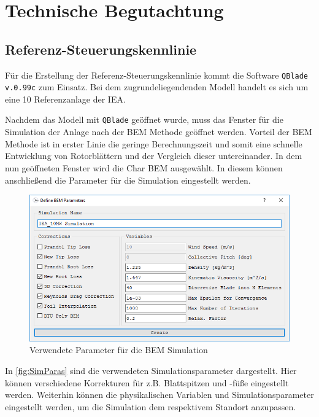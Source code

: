 \section{Technische Begutachtung}

\subsection{Referenz-Steuerungskennlinie}

Für die Erstellung der Referenz-Steuerungskennlinie kommt die Software \texttt{QBlade v.0.99c} zum Einsatz. Bei dem zugrundeliegendenden Modell handelt es sich um eine \SI{10}{\mw} Referenzanlage der \gls{IEA}.\medskip

Nachdem das Modell mit \texttt{QBlade} geöffnet wurde, muss das Fenster für die Simulation der Anlage nach der \gls{BEM} Methode geöffnet werden. Vorteil der \gls{BEM} Methode ist in erster Linie die geringe Berechnungszeit und somit eine schnelle Entwicklung von Rotorblättern und der Vergleich dieser untereinander. In dem nun geöffneten Fenster wird die \glqq Char \gls{BEM}\grqq{} ausgewählt. In diesem können anschließend die Parameter für die Simulation eingestellt werden.

\begin{figure}[H]
    \centering
    \includegraphics[width=\textwidth]{Bilder/QBlade_CharBEM_SimParas}
    \caption{Verwendete Parameter für die BEM Simulation}\label{fig:SimParas}
\end{figure}

In \autoref{fig:SimParas} sind die verwendeten Simulationsparameter dargestellt. Hier können verschiedene Korrekturen für z.B. Blattspitzen und -füße eingestellt werden. Weiterhin können die physikalischen Variablen und Simulationsparameter eingestellt werden, um die Simulation dem respektivem Standort anzupassen.

